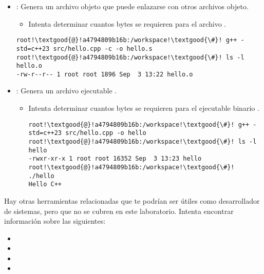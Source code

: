 \begin{itemize}
  \item {}:
        Genera un archivo objeto  que puede enlazarse con 
        otros archivos objeto.
    \begin{itemize}
      \item Intenta determinar cuantos bytes se requieren para el archivo .
    \end{itemize}
\begin{lstlisting}[style=terminal,escapechar=!]
root!\textgood{@}!a4794809b16b:/workspace!\textgood{\#}! g++ -std=c++23 src/hello.cpp -c -o hello.s
root!\textgood{@}!a4794809b16b:/workspace!\textgood{\#}! ls -l hello.o
-rw-r--r-- 1 root root 1896 Sep  3 13:22 hello.o
\end{lstlisting}

  \item {}:
        Genera un archivo ejecutable .
    \begin{itemize}
      \item Intenta determinar cuantos bytes se requieren para el 
            ejecutable binario .
\begin{lstlisting}[style=terminal,escapechar=!]
root!\textgood{@}!a4794809b16b:/workspace!\textgood{\#}! g++ -std=c++23 src/hello.cpp -o hello
root!\textgood{@}!a4794809b16b:/workspace!\textgood{\#}! ls -l hello
-rwxr-xr-x 1 root root 16352 Sep  3 13:23 hello
root!\textgood{@}!a4794809b16b:/workspace!\textgood{\#}! ./hello
Hello C++
\end{lstlisting}
    \end{itemize}
\end{itemize}

Hay otras herramientas relacionadas que te podrían ser útiles como desarrollador de sistemas, pero que no se cubren en este laboratorio.
Intenta encontrar información sobre las siguientes:

\begin{itemize}
  \item {}
  \item {}
  \item {}
  \item {}
\end{itemize}

